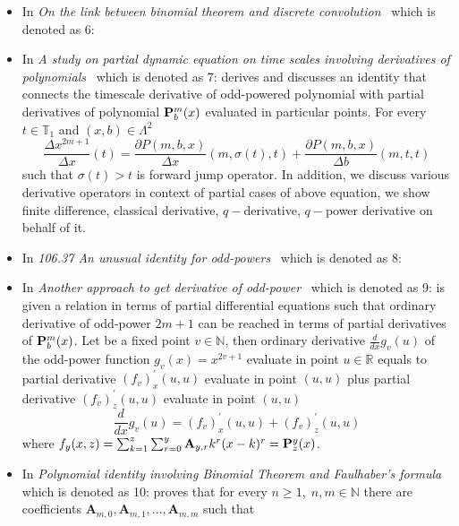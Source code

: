 \begin{itemize}
    \item In \textit{On the link between binomial theorem and discrete convolution}~\cite{kolosov2016link}
    which is denoted as 6:
    \item In \textit{A study on partial dynamic equation on time scales involving derivatives
    of polynomials}~\cite{kolosov2016study} which is denoted as 7:
    derives and discusses an identity that connects the timescale derivative of odd-powered polynomial
    with partial derivatives of polynomial ${\mathbf{P}}\sp{m} \sb{b}(x)$ evaluated in particular points.
    For every $t\in\mathbb{T}_1$ and $(x,b) \in \Lambda^2$
    \[
        \frac{\Delta x^{2m+1}}{\Delta x}(t) =
        \frac{\partial P(m,b,x)}{\Delta x} (m, \sigma(t), t) +
        \frac{\partial P(m,b,x)}{\Delta b} (m, t, t)
    \]
    such that $\sigma(t) > t$ is forward jump operator.
    In addition, we discuss various derivative operators in context of partial cases of above equation,
    we show finite difference, classical derivative, $q-$derivative, $q-$power derivative on behalf of it.
    \item In \textit{106.37 An unusual identity for odd-powers}~\cite{kolosov2022106} which is denoted as 8:
    \item In \textit{Another approach to get derivative of odd-power}~\cite{kolosov2023another} which is denoted as 9:
    is given a relation in terms of partial differential equations such that
    ordinary derivative of odd-power $2m+1$ can be reached in terms of partial derivatives of ${\mathbf{P}}\sp{m} \sb{b}(x)$.
    Let be a fixed point $v\in \mathbb{N}$, then ordinary derivative $\frac{d}{dx} g_v (u)$ of the odd-power function $g_v(x) = x^{2v + 1}$
    evaluate in point $u\in\mathbb{R}$ equals to partial derivative $(f_{v})^{'}_{x} (u, u)$ evaluate in point $(u, u)$ plus
    partial derivative $(f_{v})^{'}_{z} (u, u)$ evaluate in point $(u, u)$
    \begin{equation}
        \frac{d}{dx} g_v (u) = (f_{v})^{'}_{x} (u, u) + (f_{v})^{'}_{z} (u, u)
        \label{eq:odd-exponential-identity}
    \end{equation}
    where $f_{y} (x, z) = \sum_{k=1}^{z} \sum_{r=0}^{y} {\mathbf{A}} \sb{y,r} k^r (x-k)^r = {\mathbf{P}}\sp{y} \sb{z}(x)$.
    \item In \textit{Polynomial identity involving Binomial Theorem and Faulhaber's formula}~\cite{kolosov2023polynomial}
    which is denoted as 10: proves that
    for every $n\geq 1, \; n,m\in\mathbb{N}$
    there are coefficients $\mathbf{A}_{m,0}, \mathbf{A}_{m,1}, \ldots, \mathbf{A}_{m,m}$ such that

\end{itemize}
